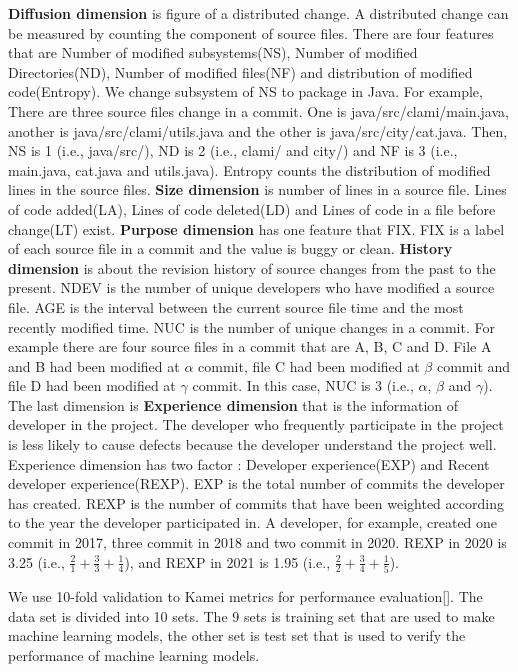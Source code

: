 \textbf{Diffusion dimension} is figure of a distributed change. A distributed change can be measured by counting the component of source files. There are four features that are Number of modified subsystems(NS), Number of modified Directories(ND), Number of modified files(NF) and distribution of modified code(Entropy). We change subsystem of NS to package in Java. For example, There are three source files change in a commit. One is java/src/clami/main.java, another is java/src/clami/utils.java and the other is java/src/city/cat.java. Then, NS is 1 (i.e., java/src/), ND is 2 (i.e., clami/ and city/) and NF is 3 (i.e., main.java, cat.java and utils.java). Entropy counts the distribution of modified lines in the source files. \textbf{Size dimension} is number of lines in a source file. Lines of code added(LA), Lines of code deleted(LD) and Lines of code in a file before change(LT) exist. \textbf{Purpose dimension} has one feature that FIX. FIX is a label of each source file in a commit and the value is buggy or clean.
\textbf{History dimension} is about the revision history of source changes from the past to the present. NDEV is the number of unique developers who have modified a source file. AGE is the interval between the current source file time and the most recently modified time. NUC is the number of unique changes in a commit. For example there are four source files in a commit that are A, B, C and D. File A and B had been modified at $\alpha$ commit, file C had been modified at $\beta$ commit and file D had been modified at $\gamma$ commit. In this case, NUC is 3 (i.e., $\alpha$, $\beta$ and $\gamma$). 
The last dimension is \textbf{Experience dimension} that is the information of developer in the project. The developer who frequently participate in the project is less likely to cause defects because the developer understand the project well. Experience dimension has two factor : Developer experience(EXP) and Recent developer experience(REXP). EXP is the total number of commits the developer has created. REXP is the number of commits that have been weighted according to the year the developer participated in. A developer, for example, created one commit in 2017, three commit in 2018 and two commit in 2020. REXP in 2020 is 3.25 (i.e., $\frac{2}{1} + \frac{3}{3}  + \frac{1}{4}$), and REXP in 2021 is 1.95 (i.e., $\frac{2}{2} + \frac{3}{4}  + \frac{1}{5}$).

We use 10-fold validation to Kamei metrics for performance evaluation[]. The data set is divided into 10 sets. The 9 sets is training set that are used to make machine learning models, the other set is test set that is used to verify the performance of machine learning models.


